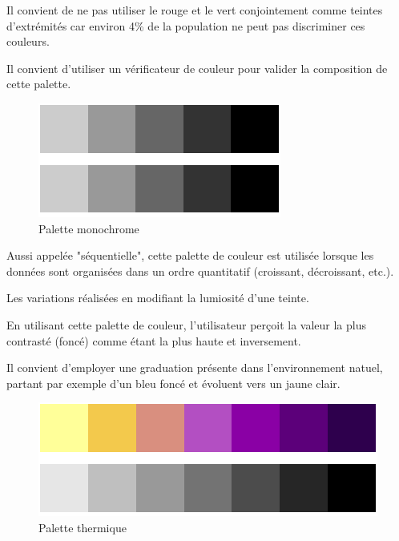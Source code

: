 \documentclass[a4paper,12pt]{article}
\begin{document}
\begin{multicols}{2}
Il convient de ne pas utiliser le rouge et le vert conjointement comme teintes d'extrémités car environ 4\% de la population ne peut pas discriminer ces couleurs. \autocite{schwabishCenteringAccessibilityData2022a}

Il convient d'utiliser un vérificateur de couleur pour valider la composition de cette palette.\autocite{andreaskrauseBestPracticesData2024}

\begin{figure}[H]
\centering
\includegraphics[width=.9\linewidth]{./img/palette-monochrome.pdf}
\caption{\label{fig:orge8504e8}Palette monochrome}
\end{figure}

Aussi appelée "séquentielle", cette palette de couleur est utilisée lorsque les données sont organisées dans un ordre quantitatif (croissant, décroissant, etc.). \autocite{wilkeColorScales2019,jonathanschwabishDevelopingDataVisualization2021} 

Les variations réalisées en modifiant la lumiosité d'une teinte.\autocite{andreaskrauseBestPracticesData2024} 

En utilisant cette palette de couleur, l'utilisateur perçoit la valeur la plus contrasté (foncé) comme étant la plus haute et inversement. \autocite{REF???}

Il convient d'employer une graduation présente dans l'environnement natuel, partant par exemple d'un bleu foncé et évoluent vers un jaune clair. \autocite{wilkeColorScales2019}

\begin{figure}[H]
\centering
\includegraphics[width=.9\linewidth]{./img/palette-thermique.pdf}
\caption{\label{fig:orgcc6649f}Palette thermique}
\end{figure}


\end{multicols}
\end{document}
